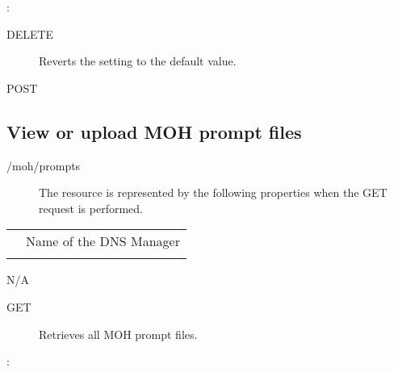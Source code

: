 \documentclass[letterpaper,10pt,english]{sphinxmanual}
\begin{document}
:

\begin{sphinxVerbatim}[commandchars=\\\{\}]
\end{sphinxVerbatim}
\begin{description}
\item[{ DELETE}] \leavevmode
Reverts the setting to the default value.

\end{description}

 POST


\subsection{View or upload MOH prompt files}
\label{\detokenize{restapi:view-or-upload-moh-prompt-files}}
 /moh/prompts
\begin{description}
\item[{}] \leavevmode
The resource is represented by the following properties when the GET request is performed.

\end{description}


\begin{savenotes}\sphinxattablestart
\centering
\begin{tabulary}{\linewidth}[t]{|T|T|}
\hline

&
\\
\hline
{}
&
Name of the DNS Manager
\\
\hline
{}
&\\
\hline
\end{tabulary}
\par
\sphinxattableend\end{savenotes}

 N/A
\begin{description}
\item[{ GET}] \leavevmode
Retrieves all MOH prompt files.

\end{description}

:
\end{document}

